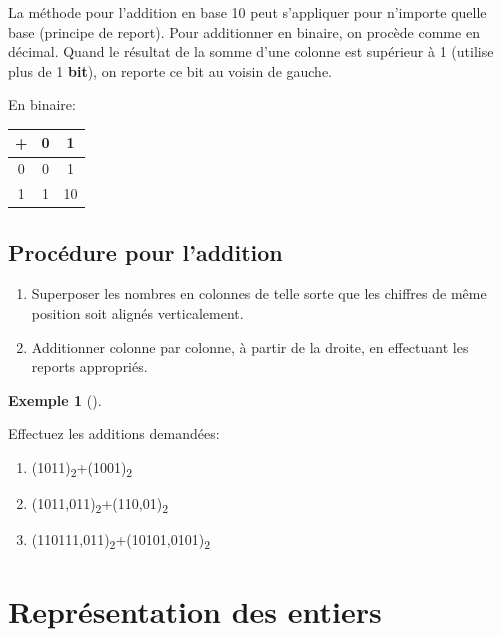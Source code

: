 \documentclass[
  letterpaper,
]{scrbook}
\providecommand{\tightlist}{%
  \setlength{\itemsep}{0pt}\setlength{\parskip}{0pt}}\usepackage{longtable,booktabs,array}
\theoremstyle{plain}
\theoremstyle{definition}
\newtheorem{example}{Exemple}[chapter]
\theoremstyle{definition}
\theoremstyle{remark}
\begin{document}
La méthode pour l'addition en base 10 peut s'appliquer pour n'importe
quelle base (principe de report). Pour additionner en binaire, on
procède comme en décimal. Quand le résultat de la somme d'une colonne
est supérieur à 1 (utilise plus de 1 \textbf{bit}), on reporte ce bit au
voisin de gauche.

En binaire:

\begin{longtable}[]{@{}ccc@{}}
\toprule()
+ & 0 & 1 \\
\midrule()
\endhead
0 & 0 & 1 \\
1 & 1 & 10 \\
\bottomrule()
\end{longtable}

\hypertarget{procuxe9dure-pour-laddition}{%
\subsection*{Procédure pour
l'addition}\label{procuxe9dure-pour-laddition}}

\begin{enumerate}
\def\labelenumi{\arabic{enumi}.}
\tightlist
\item
  Superposer les nombres en colonnes de telle sorte que les chiffres de
  même position soit alignés verticalement.
\item
  Additionner colonne par colonne, à partir de la droite, en effectuant
  les reports appropriés.
\end{enumerate}

\leavevmode{}%
\begin{example}[]\label{exm-addition-binaire}

Effectuez les additions demandées:

\begin{enumerate}
\def\labelenumi{\alph{enumi})}
\tightlist
\item
  (1011)\textsubscript{2}+(1001)\textsubscript{2}
\item
  (1011,011)\textsubscript{2}+(110,01)\textsubscript{2}
\item
  (110111,011)\textsubscript{2}+(10101,0101)\textsubscript{2}
\end{enumerate}

\end{example}

\hypertarget{repruxe9sentation-des-entiers}{%
\section{Représentation des
entiers}\label{repruxe9sentation-des-entiers}}
\end{document}
